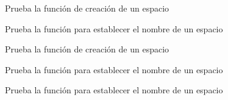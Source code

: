 
\begin{DoxyRefList}
\item[\label{test__test000001}%
\Hypertarget{test__test000001}%
Member \hyperlink{space__test_8c_a69278cc022dc5688d4725f8d36317b30}{test1\+\_\+space\+\_\+create} ()]Prueba la función de creación de un espacio  
\item[\label{test__test000003}%
\Hypertarget{test__test000003}%
Member \hyperlink{space__test_8c_a2569bab6cfeec15f722d232bb8c78c9e}{test1\+\_\+space\+\_\+set\+\_\+name} ()]Prueba la función para establecer el nombre de un espacio  
\item[\label{test__test000002}%
\Hypertarget{test__test000002}%
Member \hyperlink{space__test_8c_a012cd3cf37a8d91e2d7098a264c29d65}{test2\+\_\+space\+\_\+create} ()]Prueba la función de creación de un espacio  
\item[\label{test__test000004}%
\Hypertarget{test__test000004}%
Member \hyperlink{space__test_8c_a5a868ba017602ba6b58447cb394e81a6}{test2\+\_\+space\+\_\+set\+\_\+name} ()]Prueba la función para establecer el nombre de un espacio  
\item[\label{test__test000005}%
\Hypertarget{test__test000005}%
Member \hyperlink{space__test_8c_aa24a337830006e33706ab6ac1c416b47}{test3\+\_\+space\+\_\+set\+\_\+name} ()]Prueba la función para establecer el nombre de un espacio 
\end{DoxyRefList}
